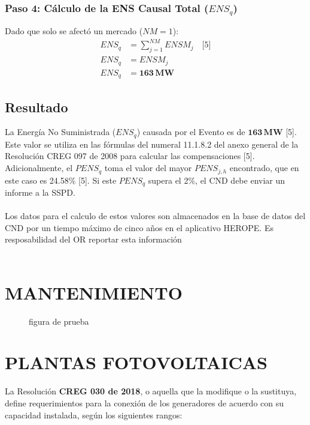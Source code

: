 \documentclass[a5paper]{book}%
\begin{document}
\subsection*{Paso 4: Cálculo de la ENS Causal Total ($ENS_q$)}

Dado que solo se afectó un mercado ($NM=1$):
\begin{align*}
	ENS_q &= \sum_{j=1}^{NM} ENSM_j \quad \text{[5]} \\
	ENS_q &= ENSM_j \\
	ENS_q &= \mathbf{163 \, \text{MW}}
\end{align*}

\section*{Resultado}

La Energía No Suministrada ($ENS_q$) causada por el Evento es de $\mathbf{163 \, \text{MW}}$ [5]. Este valor se utiliza en las fórmulas del numeral 11.1.8.2 del anexo general de la Resolución CREG 097 de 2008 para calcular las compensaciones [5]. Adicionalmente, el $PENS_q$ toma el valor del mayor $PENS_{j,h}$ encontrado, que en este caso es 24.58\% [5]. Si este $PENS_q$ supera el 2\%, el CND debe enviar un informe a la SSPD.\\\\

\hspace{1cm}
Los datos para el calculo de estos valores son almacenados en la
base de datos del CND por un tiempo máximo de cinco años en el
aplicativo HEROPE. Es resposabilidad del OR reportar esta
información\\\\


\chapter{MANTENIMIENTO}


\begin{figure}[H]
  \centering
  \caption{figura de prueba}
  \label{fig:prueba}
\end{figure}


\chapter{PLANTAS FOTOVOLTAICAS}


La Resolución \textbf{CREG 030 de 2018}, o aquella que la modifique o la sustituya, define requerimientos para la conexión de los generadores de acuerdo con su capacidad instalada,
según los siguientes rangos:
\end{document}
